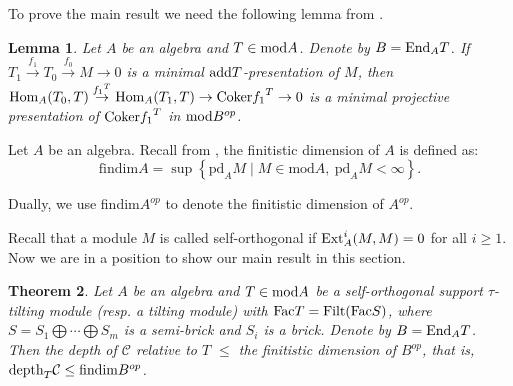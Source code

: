 \documentclass[a4paper]{amsart}
\newtheorem{thm}{Theorem}[section]
\newtheorem{lem}[thm]{Lemma}
\theoremstyle{definition}
\theoremstyle{remark}
\numberwithin{equation}{section}
\begin{document}
To prove the main result we need the following lemma from \cite[Page 8]{Xi}.

\begin{lem}\label{3.a} Let $A$ be an algebra and $T\in \textup{mod}A$. Denote by $B=\textup{End}_A T$. If $T_1\stackrel{f_1}{\rightarrow} T_0\stackrel{f_0}{\rightarrow}M\rightarrow 0$ is a minimal ${\rm add}T$-presentation of $M$, then $\textup{Hom}_A(T_0,T)\stackrel{{f_1}^T}{\rightarrow}\textup{Hom}_A(T_1,T)\rightarrow \textup{Coker} {f_1}^T\rightarrow 0$ is a minimal projective presentation of $\textup{Coker} {f_1}^T$ in $\textup{mod}B^{op}$.
\end{lem}

Let $A$ be an algebra. Recall from \cite{AuB}, the finitistic dimension of $A$ is defined as:
$$
\text{findim}A= \sup\left\{\text{pd}_A M \mid M \in \text{mod}A,\ \text{pd}_A M < \infty \right\}.
$$

Dually, we use findim$A^{op}$ to denote the finitistic dimension of $A^{op}$.

Recall that a module $M$ is called self-orthogonal if ${\rm Ext}_A^i(M,M)=0$ for all $i\geq 1$. Now we are in a position to show our main result in this section.

\begin{thm}\label{3.3}
 Let $A$ be an algebra and $T\in \textup{mod}A$ be a self-orthogonal support $\tau$-tilting module (resp. a tilting module) with
$\textup{Fac}T= \textup{Filt(Fac}S)$, where $S=S_1 \bigoplus\cdots \bigoplus S_m$ is a semi-brick and $S_i$ is a brick. Denote by $B = \textup{End}_AT$. Then the depth of $\mathcal{C}$ relative to $T$ $\leq$ the finitistic dimension of $B^{op}$, that is, ${\rm depth}_T \mathcal{C}\leq {\rm findim} B^{op}$.
\end{thm}
\end{document}
